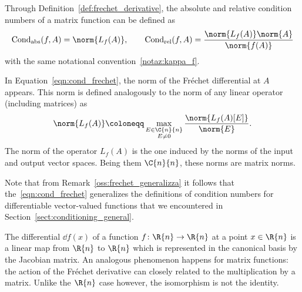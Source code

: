 \noindent Through Definition~\ref{def:frechet_derivative}, the absolute and relative condition numbers of a matrix function can be defined as
\begin{equation}\label{eqn:cond_frechet}
	\operatorname{Cond}_{\text{abs}}(f,A)=\norm{L_f(A)},\qquad\operatorname{Cond}_{\text{rel}}(f,A)=\frac{\norm{L_f(A)}\norm{A}}{\norm{f(A)}}
\end{equation}
with the same notational convention~\ref{notaz:kappa_f}.

In Equation~\eqref{eqn:cond_frechet}, the norm of the Fréchet differential at $A$ appears. This norm is defined analogously to the norm of any linear operator (including matrices) as
\begin{equation}\label{eqn:def_norm_frechet}
	\norm{L_f(A)}\coloneqq\max_{\substack{E\in\C{n}{n}\\ E\ne 0}}\frac{\norm{L_f(A)[E]}}{\norm{E}}.
\end{equation} 
The norm of the operator $L_f(A)$ is the one induced by the norms of the input and output vector spaces. Being them $\C{n}{n}$, these norms are matrix norms.  

\begin{oss*}
	Note that from Remark~\ref{oss:frechet_generalizza} it follows that the~\eqref{eqn:cond_frechet} generalizes the definitions of condition numbers for differentiable vector-valued functions that we encountered in Section~\ref{sect:conditioning_general}.
\end{oss*}

The differential $\dd f(x)$ of a function $f\colon\R{n}\to\R{n}$ at a point $x\in\R{n}$ is a linear map from $\R{n}$ to $\R{n}$ which is represented in the canonical basis by the Jacobian matrix. An analogous phenomenon happens for matrix functions: the action of the Fréchet derivative can closely related to the multiplication by a matrix. Unlike the $\R{n}$ case however, the isomorphism is not the identity.

